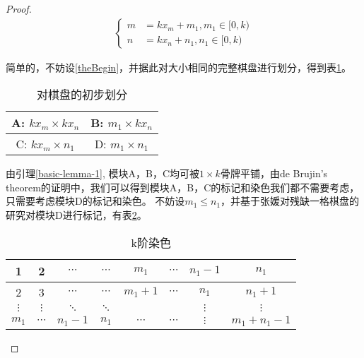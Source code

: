\begin{proof}
    \begin{align}
        \left\{
        \begin{aligned}
            m & =  kx_m + m_1, m_1 \in [0, k) \\
            n & =  kx_n + n_1, n_1 \in [0, k)
        \end{aligned}
        \right.
        \label{theBegin}
    \end{align}

    简单的，不妨设\ref{theBegin}，并据此对大小相同的完整棋盘进行划分，得到表\ref{fig:first-picture}。

    \begin{table}[h]
        \centering
        \caption{对棋盘的初步划分}
        \begin{tabular}{|c|c|}
            \hline
            A: $kx_m \times kx_n$ & B: $m_1 \times kx_n$ \\
            \hline
            C: $kx_m \times n_1$  & D: $m_1 \times n_1$  \\
            \hline
        \end{tabular}
        \label{fig:first-picture}
    \end{table}

    由引理\ref{basic-lemma-1}, 模块A，B，C均可被$1 \times k$骨牌平铺，由de Brujin's theorem\cite{fengBasicTheorem}的证明中，我们可以得到模块A，B，C的标记和染色我们都不需要考虑，
    只需要考虑模块D的标记和染色\cite{fengBasicTheorem}。
    不妨设$m_1 \le n_1$，并基于张媛对残缺一格棋盘的研究\cite{zhangOneStain}对模块D进行标记，有表\ref{fig:k-order-staining-example}。

    \begin{table}[ht]
        \centering
        \caption{k阶染色}
        \begin{tabular}{|c|c|c|c|c|c|c|c|}
            \hline
            1        & 2        & $\cdots$ & $\cdots$ & $m_1$     & $\cdots$ & $n_1 - 1$ & $n_1$           \\
            \hline
            2        & 3        & $\cdots$ & $\cdots$ & $m_1 + 1$ & $\cdots$ & $n_1$     & $n_1 + 1$       \\
            \hline
            $\vdots$ & $\vdots$ & $\ddots$ & $\ddots$ &           &          & $\vdots$  & $\vdots$        \\
            \hline
            $m_1$    & $\cdots$ & $n_1-1$  & $n_1$    & $\cdots$  & $\cdots$ & $\vdots$  & $m_1 + n_1 - 1$ \\
            \hline
        \end{tabular}
        \label{fig:k-order-staining-example}
    \end{table}


\end{proof}
